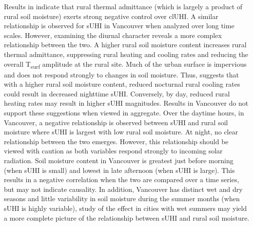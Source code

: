 \begin{bibunit}
Results in \citet{Runnalls2000} indicate that rural thermal admittance (which is largely a product of rural soil moisture) exerts strong negative control over clUHI. A similar relationship is observed for sUHI in Vancouver when analyzed over long time scales. However, examining the diurnal character reveals a more complex relationship between the two. A higher rural soil moisture content increases rural thermal admittance, suppressing rural heating and cooling rates and reducing the overall T\textsubscript{surf} amplitude at the rural site. Much of the urban surface is impervious and does not respond strongly to changes in soil moisture. Thus, \citet{Oke2017} suggests that with a higher rural soil moisture content, reduced nocturnal rural cooling rates could result in decreased nighttime sUHI. Conversely, by day, reduced rural heating rates may result in higher sUHI magnitudes. Results in Vancouver do not support these suggestions when viewed in aggregate. Over the daytime hours, in Vancouver, a negative relationship is observed between sUHI and rural soil moisture where sUHI is largest with low rural soil moisture.  At night, no clear relationship between the two emerges. However, this relationship should be viewed with caution as both variables respond strongly to incoming solar radiation. Soil moisture content in Vancouver is greatest just before morning (when sUHI is small) and lowest in late afternoon (when sUHI is large). This results in a negative correlation when the two are compared over a time series, but may not indicate causality. In addition, Vancouver has distinct wet and dry seasons and little variability in soil moisture during the summer months (when sUHI is highly variable), study of the effect in cities with wet summers may yield a more complete picture of the relationship between sUHI and rural soil moisture. 


\end{bibunit}

